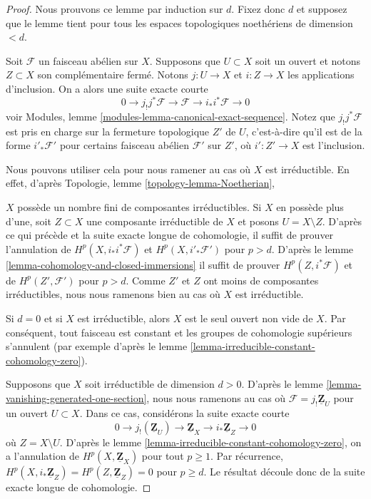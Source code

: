 \begin{proof}
Nous prouvons ce lemme par induction sur $d$. Fixez donc $d$ et supposez que le lemme tient pour tous les espaces topologiques noethériens de dimension $< d$.

\medskip\noindent
Soit $\mathcal{F}$ un faisceau abélien sur $X$. Supposons que $U \subset X$ soit un ouvert et notons $Z \subset X$ son complémentaire fermé. Notons $j : U \to X$ et $i : Z \to X$ les applications d'inclusion. On a alors une suite exacte courte $$
0 \to j_{!}j^*\mathcal{F} \to \mathcal{F} \to i_*i^*\mathcal{F} \to 0
$$ voir Modules, lemme \ref{modules-lemma-canonical-exact-sequence}. Notez que $j_!j^*\mathcal{F}$ est pris en charge sur la fermeture topologique $Z'$ de $U$, c'est-à-dire qu'il est de la forme $i'_*\mathcal{F}'$ pour certains faisceau abélien $\mathcal{F}'$ sur $Z'$, où $i' : Z' \to X$ est l'inclusion.

\medskip\noindent

Nous pouvons utiliser cela pour nous ramener au cas où $X$ est irréductible. En effet, d'après Topologie, lemme \ref{topology-lemma-Noetherian},

$X$ possède un nombre fini de composantes irréductibles. Si $X$ en possède plus d'une, soit $Z \subset X$ une composante irréductible de $X$
et posons $U = X \setminus Z$. D'après ce qui précède et la suite exacte longue de cohomologie, il suffit de prouver l'annulation de
$H^p(X, i_*i^*\mathcal{F})$ et $H^p(X, i'_*\mathcal{F}')$ pour $p > d$. D'après le lemme \ref{lemma-cohomology-and-closed-immersions} il suffit de prouver
$H^p(Z, i^*\mathcal{F})$ et de $H^p(Z', \mathcal{F}')$ pour $p > d$. Comme $Z'$ et $Z$ ont moins de composantes irréductibles, nous nous ramenons bien au cas où $X$ est irréductible.

\medskip\noindent
Si $d = 0$ et si $X$ est irréductible, alors $X$ est le seul ouvert non vide de $X$. Par conséquent, tout faisceau est constant et les groupes de cohomologie supérieurs s'annulent (par exemple d'après le lemme \ref{lemma-irreducible-constant-cohomology-zero}).

\medskip\noindent
Supposons que $X$ soit irréductible de dimension $d > 0$. D'après le lemme \ref{lemma-vanishing-generated-one-section}, nous nous ramenons au cas où $\mathcal{F} = j_!\underline{\mathbf{Z}}_U$ pour un ouvert $U \subset X$. Dans ce cas, considérons la suite exacte courte $$
0 \to j_!(\underline{\mathbf{Z}}_U) \to
\underline{\mathbf{Z}}_X \to i_*\underline{\mathbf{Z}}_Z \to 0
$$ où $Z = X \setminus U$. D'après le lemme \ref{lemma-irreducible-constant-cohomology-zero}, on a l'annulation de $H^p(X, \underline{\mathbf{Z}}_X)$ pour tout $p \geq 1$. Par récurrence, $H^p(X, i_*\underline{\mathbf{Z}}_Z) = H^p(Z, \underline{\mathbf{Z}}_Z) = 0$ pour $p \geq d$. Le résultat découle donc de la suite exacte longue de cohomologie.
\end{proof}





